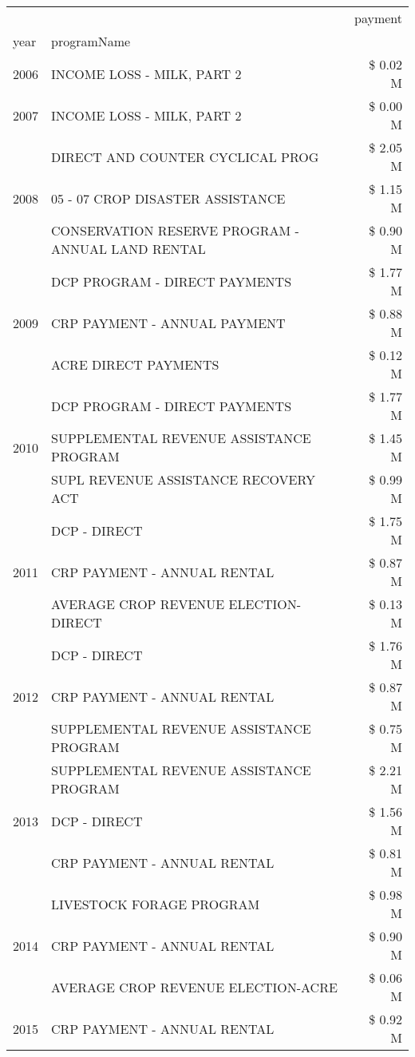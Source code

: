 \begin{tabular}{llr}
\toprule
 &  & payment \\
year & programName &  \\
\midrule
2006 & INCOME LOSS - MILK, PART 2 & \$ 0.02 M \\
\cline{1-3}
2007 & INCOME LOSS - MILK, PART 2 & \$ 0.00 M \\
\cline{1-3}
\multirow[t]{3}{*}{2008} & DIRECT AND COUNTER CYCLICAL PROG & \$ 2.05 M \\
 & 05 - 07 CROP DISASTER ASSISTANCE & \$ 1.15 M \\
 & CONSERVATION RESERVE PROGRAM - ANNUAL LAND RENTAL & \$ 0.90 M \\
\cline{1-3}
\multirow[t]{3}{*}{2009} & DCP PROGRAM - DIRECT PAYMENTS & \$ 1.77 M \\
 & CRP PAYMENT - ANNUAL PAYMENT & \$ 0.88 M \\
 & ACRE DIRECT PAYMENTS & \$ 0.12 M \\
\cline{1-3}
\multirow[t]{3}{*}{2010} & DCP PROGRAM - DIRECT PAYMENTS & \$ 1.77 M \\
 & SUPPLEMENTAL REVENUE ASSISTANCE PROGRAM & \$ 1.45 M \\
 & SUPL REVENUE ASSISTANCE RECOVERY ACT & \$ 0.99 M \\
\cline{1-3}
\multirow[t]{3}{*}{2011} & DCP - DIRECT & \$ 1.75 M \\
 & CRP PAYMENT - ANNUAL RENTAL & \$ 0.87 M \\
 & AVERAGE CROP REVENUE ELECTION-DIRECT & \$ 0.13 M \\
\cline{1-3}
\multirow[t]{3}{*}{2012} & DCP - DIRECT & \$ 1.76 M \\
 & CRP PAYMENT - ANNUAL RENTAL & \$ 0.87 M \\
 & SUPPLEMENTAL REVENUE ASSISTANCE PROGRAM & \$ 0.75 M \\
\cline{1-3}
\multirow[t]{3}{*}{2013} & SUPPLEMENTAL REVENUE ASSISTANCE PROGRAM & \$ 2.21 M \\
 & DCP - DIRECT & \$ 1.56 M \\
 & CRP PAYMENT - ANNUAL RENTAL & \$ 0.81 M \\
\cline{1-3}
\multirow[t]{3}{*}{2014} & LIVESTOCK FORAGE PROGRAM & \$ 0.98 M \\
 & CRP PAYMENT - ANNUAL RENTAL & \$ 0.90 M \\
 & AVERAGE CROP REVENUE ELECTION-ACRE & \$ 0.06 M \\
\cline{1-3}
\multirow[t]{3}{*}{2015} & CRP PAYMENT - ANNUAL RENTAL & \$ 0.92 M \\

\end{tabular}

